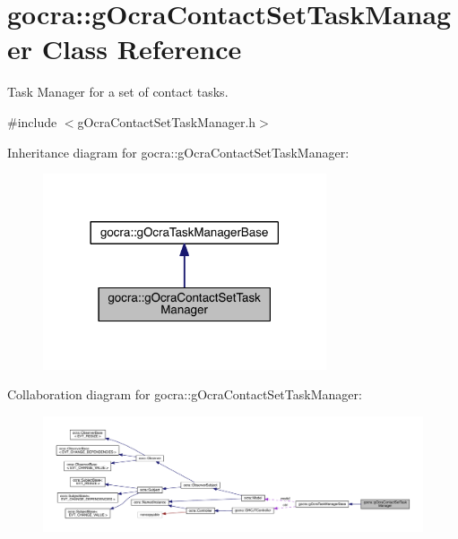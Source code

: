 \hypertarget{classgocra_1_1gOcraContactSetTaskManager}{}\section{gocra\+:\+:g\+Ocra\+Contact\+Set\+Task\+Manager Class Reference}
\label{classgocra_1_1gOcraContactSetTaskManager}


Task Manager for a set of contact tasks.  




{\ttfamily \#include $<$g\+Ocra\+Contact\+Set\+Task\+Manager.\+h$>$}



Inheritance diagram for gocra\+:\+:g\+Ocra\+Contact\+Set\+Task\+Manager\+:\nopagebreak
\begin{figure}[H]
\begin{center}
\leavevmode
\includegraphics[width=237pt]{d7/d57/classgocra_1_1gOcraContactSetTaskManager__inherit__graph}
\end{center}
\end{figure}


Collaboration diagram for gocra\+:\+:g\+Ocra\+Contact\+Set\+Task\+Manager\+:\nopagebreak
\begin{figure}[H]
\begin{center}
\leavevmode
\includegraphics[width=350pt]{d7/d15/classgocra_1_1gOcraContactSetTaskManager__coll__graph}
\end{center}
\end{figure}
